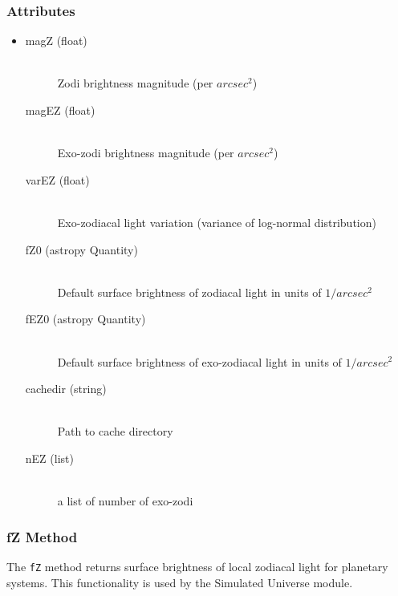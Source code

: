 \documentclass[cleanfoot]{asme2ej}
\begin{document}
\subsubsection*{Attributes}
\begin{itemize}
\item
\begin{description}
    \item[magZ (float)] \hfill \\ Zodi brightness magnitude (per $ arcsec^2 $)
    \item[magEZ (float)] \hfill \\ Exo-zodi brightness magnitude (per $ arcsec^2 $)
    \item[varEZ (float)] \hfill \\ Exo-zodiacal light variation (variance of log-normal distribution)
    \item[fZ0 (astropy Quantity)] \hfill \\ Default surface brightness of zodiacal light in units of $ 1/arcsec^2 $ 
    \item[fEZ0 (astropy Quantity)] \hfill \\ Default surface brightness of exo-zodiacal light in units of $ 1/arcsec^2 $ 
    \item[cachedir (string)] \hfill \\ Path to cache directory
    \item[nEZ (list)] \hfill \\ a list of number of exo-zodi
\end{description}
\end{itemize}

\subsubsection{fZ Method} \label{sec:fZtask}
The \verb+fZ+ method returns surface brightness of local zodiacal light for planetary systems.  This functionality is used by the Simulated Universe module.
\end{document}
